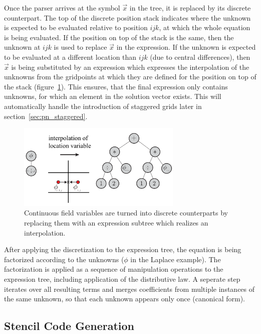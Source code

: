 Once the parser arrives at the symbol $\vec{x}$ in the tree, it is replaced by its discrete counterpart. The top of the discrete position stack indicates where the unknown is expected to be evaluated relative to position $ijk$, at which the whole equation is being evaluated. If the position on top of the stack is the same, then the unknown at $ijk$ is used to replace $\vec{x}$ in the expression. If the unknown is expected to be evaluated at a different location than $ijk$ (due to central differences), then $\vec{x}$ is being substituted by an expression which expresses the interpolation of the unknowns from the gridpoints at which they are defined for the position on top of the stack (figure~\ref{fig:pn_discretization_interpolation}). This ensures, that the final expression only contains unknowns, for which an element in the solution vector exists. This will automatically handle the introduction of staggered grids later in section~\ref{sec:pn_staggered}.
\begin{figure}[h]
\centering
\includegraphics[width=0.7\textwidth]{04_pn_method/figures/fig_car_interpolation.pdf}
\caption{Continuous field variables are turned into discrete counterparts by replacing them with an expression subtree which realizes an interpolation.}
\label{fig:pn_discretization_interpolation}
\end{figure}

After applying the discretization to the expression tree, the equation is being factorized according to the unknowns ($\phi$ in the Laplace example). The factorization is applied as a sequence of manipulation operations to the expression tree, including application of the distributive law. A seperate step iterates over all resulting terms and merges coefficients from multiple instances of the same unknown, so that each unknown appears only once (canonical form).

\subsection{Stencil Code Generation}
\label{sec:pn_stencil_gen2}

